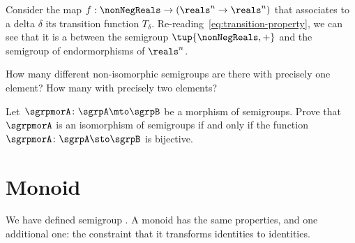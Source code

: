 \begin{example}
  Consider the map $f: \nonNegReals \to (\reals^n \to \reals^n)$ that associates to a delta $\delta$
  its transition function $T_\delta$.
  Re-reading~\cref{eq:transition-property}, we can see that it is a \whomo between the semigroup $\tup{\nonNegReals,+}$ and the semigroup of endormorphisms of $\reals^n$.
\end{example}




\begin{exercise}
  \label{ex:non-isomorphic}
  How many different non-isomorphic semigroups are there with precisely one element?
  How many with precisely two elements?
\end{exercise}
\begin{solution}
\end{solution}

\begin{exercise}
  \label{ex:semi-morph}
  Let~$\sgrpmorA\colon \sgrpA \mto \sgrpB$ be a morphism of semigroups.
  Prove that~$\sgrpmorA$ is an isomorphism of semigroups if and only if the function~$\sgrpmorA\colon \sgrpA \sto \sgrpB$ is bijective.
\end{exercise}
\begin{solution}
\end{solution}


\section{Monoid \whomos}

We have defined semigroup \whomo. A monoid \whomo has the same properties, and one additional one: the constraint that it transforms identities to identities.

